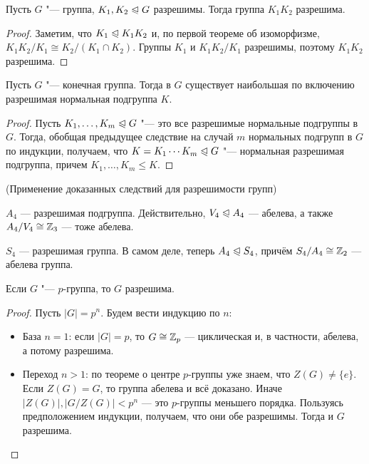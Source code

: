 \begin{corollary}
	Пусть $G$ "--- группа, $K_1, K_2 \trianglelefteqslant G$ разрешимы. Тогда группа $K_1K_2$ разрешима.
\end{corollary}

\begin{proof}
	Заметим, что $K_1 \trianglelefteqslant K_1K_2$ и, по первой теореме об изоморфизме, $K_1K_2/K_1 \cong K_2/(K_1 \cap K_2)$. Группы $K_1$ и $K_1K_2 / K_1$ разрешимы, поэтому $K_1K_2$ разрешима.
\end{proof}

\begin{corollary}
	Пусть $G$ "--- конечная группа. Тогда в $G$ существует наибольшая по включению разрешимая нормальная подгруппа $K$.
\end{corollary}

\begin{proof}
	Пусть $K_1, \ldots, K_m \trianglelefteqslant G$ "--- это все разрешимые нормальные подгруппы в $G$. Тогда, обобщая предыдущее следствие на случай $m$ нормальных подгрупп в $G$ по индукции, получаем, что $K = K_1\dotsm K_m \trianglelefteqslant G$ "--- нормальная разрешимая подгруппа, причем $K_1, \ldots, K_m \le K$.
\end{proof}

\begin{example} (Применение доказанных следствий для разрешимости групп)
	\item $A_4$ --- разрешимая подгруппа. Действительно, $V_4 \trianglelefteqslant A_4$ --- абелева, а также $A_4 / V_4 \cong \mathbb{Z}_3$ --- тоже абелева.
	
	\item $S_4$ --- разрешимая группа. В самом деле, теперь $A_4 \trianglelefteqslant S_4$, причём $S_4 / A_4 \cong \mathbb{Z}_2$ --- абелева группа.
\end{example}

\begin{proposition}
	Если $G$ "--- $p$-группа, то $G$ разрешима.
\end{proposition}

\begin{proof}
	Пусть $|G| = p^n$. Будем вести индукцию по $n$:
	\begin{itemize}
		\item База $n = 1$: если $|G| = p$, то $G \cong \mathbb{Z}_p$ --- циклическая и, в частности, абелева, а потому разрешима.
		
		\item Переход $n > 1$: по теореме о центре $p$-группы уже знаем, что $Z(G) \neq \{e\}$. Если $Z(G) = G$, то группа абелева и всё доказано. Иначе $|Z(G)|, |G / Z(G)| < p^n$ --- это $p$-группы меньшего порядка. Пользуясь предположением индукции, получаем, что они обе разрешимы. Тогда и $G$ разрешима.
	\end{itemize}
\end{proof}

